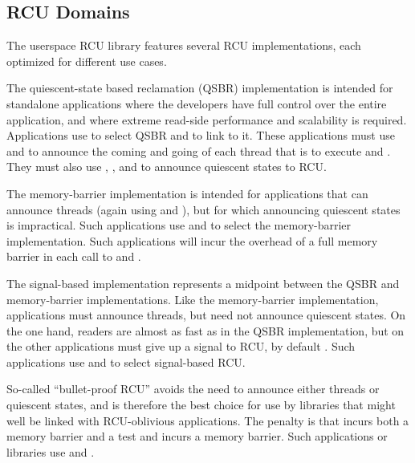 \documentclass[letterpaper,twocolumn,10pt]{article}
\begin{document}
\subsection{RCU Domains}
\label{sec:RCU Domains}

The userspace RCU library features several RCU implementations, each
optimized for different use cases.

The quiescent-state based reclamation (QSBR) implementation is intended
for standalone applications where the developers have full control
over the entire application, and where extreme read-side performance
and scalability is required.
Applications use  to select QSBR and
 to link to it.
These applications must use  and
 to announce the coming and going
of each thread that is to execute  and
.
They must also use , ,
and  to announce quiescent states to RCU.

The memory-barrier implementation is intended for applications that
can announce threads (again using  and
), but for which announcing quiescent states is
impractical.
Such applications use  and
 to select the memory-barrier implementation.
Such applications will incur the overhead of a full memory barrier in
each call to  and .

The signal-based implementation represents a midpoint between the QSBR
and memory-barrier implementations.
Like the memory-barrier implementation, applications must announce
threads, but need not announce quiescent states.
On the one hand, readers are almost as fast as in the QSBR implementation,
but on the other applications must give up a signal to RCU, by default
.
Such applications use  and
 to select signal-based RCU.

So-called ``bullet-proof RCU'' avoids the need to announce either threads
or quiescent states, and is therefore the best choice for use by
libraries that might well be linked with RCU-oblivious applications.
The penalty is that  incurs both a memory barrier
and a test and  incurs a memory barrier.
Such applications or libraries use  and
.
\end{document}
